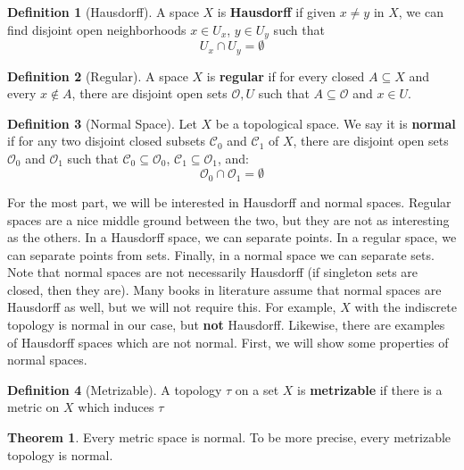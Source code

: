 \documentclass[11pt, oneside]{amsart}   	%
\theoremstyle{definition}
\newtheorem{definition}{Definition}[section]
\newtheorem{theorem}{Theorem}[section]
\begin{document}
	\begin{definition}[Hausdorff]
		A space $X$ is \textbf{Hausdorff} if given $x\neq y$ in $X$, we can find disjoint open neighborhoods $x\in U_x$, 
		$y\in U_y$ such that 
		$$
			U_x\cap U_y = \emptyset
		$$
	\end{definition}
	
	\begin{definition}[Regular]
		A space $X$ is \textbf{regular} if for every closed $A\subseteq X$ and every $x\notin A$, there are disjoint open 
		sets $\mathcal O, U$ such that $A\subseteq\mathcal O$ and $x\in U$.
	\end{definition}
	
	\begin{definition}[Normal Space]
		Let $X$ be a topological space. We say it is \textbf{normal} if for any two disjoint closed subsets $\mathcal C_0$ 
		and $\mathcal C_1$ of $X$, there are disjoint open sets $\mathcal O_0$ and $\mathcal O_1$ such that 
		$\mathcal C_0\subseteq\mathcal O_0$, $\mathcal C_1\subseteq\mathcal O_1$, and:
		$$
			\mathcal O_0\cap\mathcal O_1 = \emptyset
		$$
	\end{definition}
	
	For the most part, we will be interested in Hausdorff and normal spaces. Regular spaces are a nice middle ground 
	between the two, but they are not as interesting as the others. In a Hausdorff space, we can separate points. In a 
	regular space, we can separate points from sets. Finally, in a normal space we can separate sets. Note that normal 
	spaces are not necessarily Hausdorff (if singleton sets are closed, then they are). Many books in literature assume that 
	normal spaces are Hausdorff as well, but we will not require this. For example, $X$ with the indiscrete topology is normal 
	in our case, but \textbf{not} Hausdorff. Likewise, there are examples of Hausdorff spaces which are not normal. First, we 
	will show some properties of normal spaces.
	
	\begin{definition}[Metrizable]
		A topology $\tau$ on a set $X$ is \textbf{metrizable} if there is a metric on $X$ which induces $\tau$
	\end{definition}
	
	\begin{theorem}
		Every metric space is normal. To be more precise, every metrizable topology is normal.
	\end{theorem}
	
\end{document}
